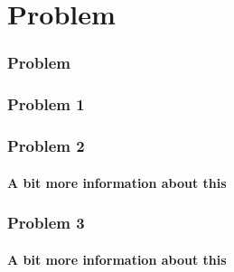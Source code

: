 \documentclass{beamer}
\begin{document}
\section{Problem}
   \begin{frame}
    \frametitle{Problem}
  \end{frame}
  \begin{frame}
    \frametitle{Problem 1}
  \end{frame}
  \begin{frame}
    \frametitle{Problem 2}
    \framesubtitle{A bit more information about this}
  \end{frame}
  \begin{frame}
    \frametitle{Problem 3}
    \framesubtitle{A bit more information about this}
  \end{frame}
\end{document}
